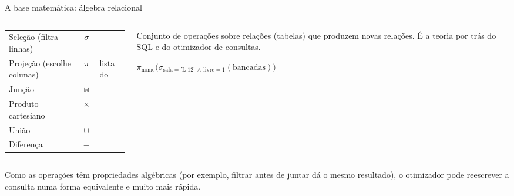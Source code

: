\documentclass[aspectratio=169,10pt]{beamer}
\begin{document}
\begin{frame}{A base matemática: álgebra relacional}
  \begin{columns}[T]
    \begin{column}{0.52\textwidth}
      \scriptsize
      \begin{tabularx}{\linewidth}{@{}l c L@{}}
        \toprule
         &  &  \\
        \midrule
        Seleção (filtra linhas) & $\sigma$ &  \\
        Projeção (escolhe colunas) & $\pi$ & lista do  \\
        Junção & $\bowtie$ &  \\
        Produto cartesiano & $\times$ &  \\
        União & $\cup$ &  \\
        Diferença & $-$ &  \\
        \bottomrule
      \end{tabularx}
    \end{column}
    \begin{column}{0.46\textwidth}
      \begin{definicao}
        Conjunto de operações sobre relações (tabelas) que produzem novas relações. É a teoria por trás do SQL e do otimizador de consultas.
      \end{definicao}
      \begin{exemplo}
        $\pi_{\text{nome}}\big(\sigma_{\text{sala}=\text{'L-12'} \,\wedge\, \text{livre}=1}(\text{bancadas})\big)$\\[3pt]
        \\
      \end{exemplo}
    \end{column}
  \end{columns}
  \begin{pordentro}
    Como as operações têm propriedades algébricas (por exemplo, filtrar antes de juntar dá o mesmo resultado), o otimizador pode reescrever a consulta numa forma equivalente e muito mais rápida.
  \end{pordentro}
\end{frame}

\end{document}
